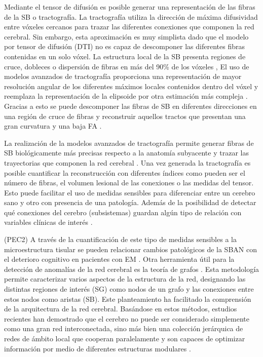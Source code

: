 Mediante el tensor de difusión es posible generar una representación de las fibras de la SB o tractografía. La tractografía utiliza la dirección de máxima difusividad entre vóxeles cercanos para trazar las diferentes conexiones que componen la red cerebral. Sin embargo, esta aproximación es muy simplista dado que el modelo por tensor de difusión (DTI) no es capaz de descomponer las diferentes fibras contenidas en un solo vóxel. La estructura local de la SB presenta regiones de cruce, dobleces o dispersión de fibras en más del 90\% de los vóxeles \cite{Jeurissen2013InvestigatingImaging}, El uso de modelos avanzados de tractografía proporciona una representación de mayor resolución angular de los diferentes máximos locales contenidos dentro del vóxel y reemplaza la representación de la elipsoide por otra estimación más compleja \cite{Tuch2002HighHeterogeneity}. Gracias a esto se puede descomponer las fibras de SB en diferentes direcciones en una región de cruce de fibras y reconstruir aquellos tractos que presentan una gran curvatura y una baja FA \cite{Martinez-Heras2015ImprovedRadiation}.  

La realización de la modelos avanzados de tractografía permite generar fibras de SB biológicamente más precisas respecto a la anatomía subyacente y trazar las trayectorias que componen la red cerebral \cite{Rubinov2010ComplexInterpretations}. Una vez generada la  tractografía es posible cuantificar la reconstrucción con diferentes índices como pueden ser el número de fibras, el volumen lesional de las conexiones o las medidas del tensor. Esto puede facilitar el uso de medidas sensibles para diferenciar entre un cerebro sano y otro con presencia de una patología. Además de la posibilidad de detectar qué conexiones del cerebro (subsistemas) guardan algún tipo de relación con variables clínicas de interés \cite{Llufriu2017StructuralSclerosis}. 

(PEC2) A través de la cuantificación de este tipo de medidas sensibles a la microestructura tisular se pueden relacionar cambios patológicos de la SBAN con el deterioro cognitivo en pacientes con EM \cite{Gabilondo2014Trans-synapticSclerosis} \cite{Llufriu2017StructuralSclerosis}. Otra herramienta útil para la detección de anomalías de la red cerebral es la teoría de grafos \cite{Bullmore2009ComplexSystems}. Esta metodología permite caracterizar varios aspectos de la estructura de la red, designando las distintas regiones de interés (SG) como nodos de un grafo y las conexiones entre estos nodos como aristas (SB). Este planteamiento ha facilitado la comprensión de la arquitectura de la red cerebral. Basándose en estos métodos, estudios recientes han demostrado que el cerebro no puede ser considerado simplemente como una gran red interconectada, sino más bien una colección jerárquica de redes de ámbito local que cooperan paralelamente y son capaces de optimizar información por medio de diferentes estructuras modulares \cite{Sporns2011NetworksBrain}. 

